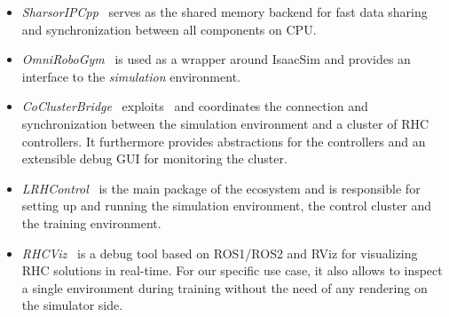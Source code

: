 \begin{itemize}
	\item \textit{SharsorIPCpp}~\cite{mystuff::sharsoripcpp} serves as the shared memory backend for fast data sharing and synchronization between all components on CPU.
	\item \textit{OmniRoboGym}~\cite{mystuff::omnirobogym} is used as a wrapper around IsaacSim and provides an interface to the \textit{simulation} environment.
	\item \textit{CoClusterBridge}~\cite{mystuff::coclusterbridge} exploits~\cite{mystuff::sharsoripcpp} and coordinates the connection and synchronization between the simulation environment and a cluster of RHC controllers. It furthermore provides abstractions for the controllers and an extensible debug GUI for monitoring the cluster.
	\item \textit{LRHControl}~\cite{mystuff::lrhccontrol} is the main package of the ecosystem and is responsible for setting up and running the simulation environment, the control cluster and the training environment.
	\item \textit{RHCViz}~\cite{mystuff::rhcviz} is a debug tool based on ROS1/ROS2 and RViz for visualizing RHC solutions in real-time. For our specific use case, it also allows to inspect a single environment during training without the need of any rendering on the simulator side.
\end{itemize}




